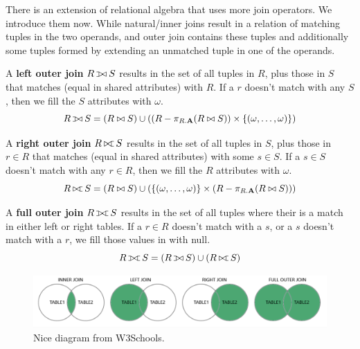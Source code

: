 \documentclass{article}
\def\ojoin{\setbox0=\hbox{$\bowtie$}%
    \rule[-.02ex]{.25em}{.4pt}\llap{\rule[\ht0]{.25em}{.4pt}}}
\def\lojoin{\mathbin{\ojoin\mkern-5.8mu\bowtie}}
\def\rojoin{\mathbin{\bowtie\mkern-5.8mu\ojoin}}
\def\fojoin{\mathbin{\ojoin\mkern-5.8mu\bowtie\mkern-5.8mu\ojoin}}
\begin{document}
      There is an extension of relational algebra that uses more join operators. We introduce them now. While natural/inner joins result in a relation of matching tuples in the two operands, and outer join contains these tuples and additionally some tuples formed by extending an unmatched tuple in one of the operands. 

      \begin{definition}
        A \textbf{left outer join} $R \lojoin S$ results in the set of all tuples in $R$, plus those in $S$ that matches (equal in shared attributes) with $R$. If a $r$ doesn't match with any $S$, then we fill the $S$ attributes with $\omega$. 
        \begin{equation}
          R \lojoin S = (R \bowtie S) \cup ( (R - \pi_{R.\mathbf{A}} (R \bowtie S)) \times \{(\omega, \ldots, \omega)\})
        \end{equation}
      \end{definition} 

      \begin{definition}
        A \textbf{right outer join} $R \rojoin S$ results in the set of all tuples in $S$, plus those in $r \in R$ that matches (equal in shared attributes) with some $s \in S$. If a $s \in S$ doesn't match with any $r \in R$, then we fill the $R$ attributes with $\omega$. 
        \begin{equation}
          R \rojoin S = (R \bowtie S) \cup ( \{(\omega, \ldots, \omega)\} \times (R - \pi_{R.\mathbf{A}} (R \bowtie S)))
        \end{equation}
      \end{definition}

      \begin{definition}
        A \textbf{full outer join} $R \fojoin S$ results in the set of all tuples where their is a match in either left or right tables. If a $r \in R$ doesn't match with a $s$, or a $s$ doesn't match with a $r$, we fill those values in with null. 
        \begin{equation}
          R \fojoin S = (R \lojoin S) \cup (R \rojoin S)
        \end{equation}
      \end{definition}

      \begin{figure}[H]
        \centering 
        \includegraphics[scale=0.4]{img/outerjoin.png}
        \caption{Nice diagram from W3Schools.} 
        \label{fig:outerjoin}
      \end{figure} 
\end{document}
